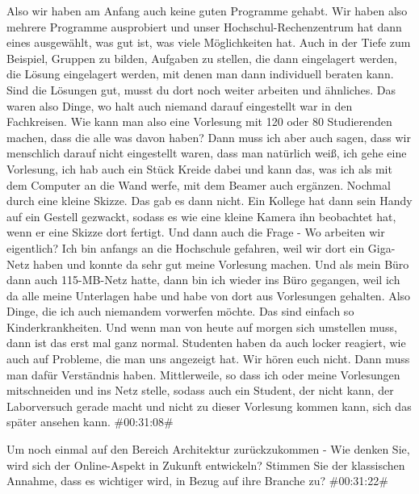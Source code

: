 \begin{description}
\Andre Also wir haben am Anfang auch keine guten Programme gehabt. Wir haben also mehrere Programme ausprobiert und unser Hochschul-Rechenzentrum hat dann eines ausgewählt, was gut ist, was viele Möglichkeiten hat. Auch in der Tiefe zum Beispiel, Gruppen zu bilden, Aufgaben zu stellen, die dann eingelagert werden, die Lösung eingelagert werden, mit denen man dann individuell beraten kann. Sind die Lösungen gut, musst du dort noch weiter arbeiten und ähnliches. Das waren also Dinge, wo halt auch niemand darauf eingestellt war in den Fachkreisen. Wie kann man also eine Vorlesung mit 120 oder 80 Studierenden machen, dass die alle was davon haben? Dann muss ich aber auch sagen, dass wir menschlich darauf nicht eingestellt waren, dass man natürlich weiß, ich gehe eine Vorlesung, ich hab auch ein Stück Kreide dabei und kann das, was ich als mit dem Computer an die Wand werfe, mit dem Beamer auch ergänzen. Nochmal durch eine kleine Skizze. Das gab es dann nicht. Ein Kollege hat dann sein Handy auf ein Gestell gezwackt, sodass es wie eine kleine Kamera ihn beobachtet hat, wenn er eine Skizze dort fertigt. Und dann auch die Frage - Wo arbeiten wir eigentlich? Ich bin anfangs an die Hochschule gefahren, weil wir dort ein Giga-Netz haben und konnte da sehr gut meine Vorlesung machen. Und als mein Büro dann auch 115-MB-Netz hatte, dann bin ich wieder ins Büro gegangen, weil ich da alle meine Unterlagen habe und habe von dort aus Vorlesungen gehalten. Also Dinge, die ich auch niemandem vorwerfen möchte. Das sind einfach so Kinderkrankheiten. Und wenn man von heute auf morgen sich umstellen muss, dann ist das erst mal ganz normal. Studenten haben da auch locker reagiert, wie auch auf Probleme, die man uns angezeigt hat. Wir hören euch nicht. Dann muss man dafür Verständnis haben. Mittlerweile, so dass ich oder meine Vorlesungen mitschneiden und ins Netz stelle, sodass auch ein Student, der nicht kann, der Laborversuch gerade macht und nicht zu dieser Vorlesung kommen kann, sich das später ansehen kann. \#00:31:08\#

\Fabian Um noch einmal auf den Bereich Architektur zurückzukommen - Wie denken Sie, wird sich der Online-Aspekt in Zukunft entwickeln? Stimmen Sie der klassischen Annahme, dass es wichtiger wird, in Bezug auf ihre Branche zu? \#00:31:22\#


\end{description}
